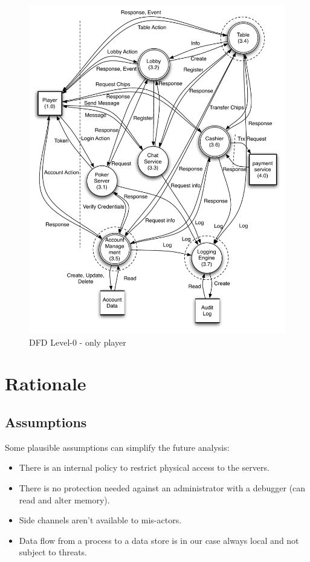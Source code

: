 \documentclass[a4paper,11pt]{report}
\begin{document}
\begin{figure}[htpb]
  \begin{center}
    \includegraphics[scale=0.7]{dfd_level_0_player}
  \end{center}
  \caption{DFD Level-0 - only player}\label{fig:level_0_player}
\end{figure}

\section{Rationale}

\subsection{Assumptions}
Some plausible assumptions can simplify the future analysis:
\begin{itemize}
\item There is an internal policy to restrict physical access to the servers.
\item There is no protection needed against an administrator with a debugger (can read and alter memory).
\item Side channels aren't available to mis-actors.
\item Data flow from a process to a data store is in our case always local and not subject to threats.
\end{itemize}
\end{document}

